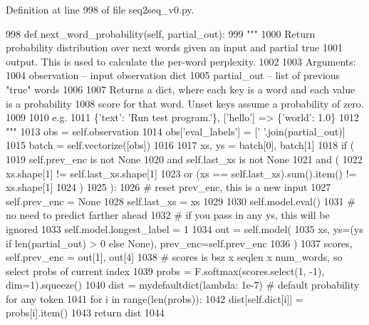 Definition at line 998 of file seq2seq\+\_\+v0.\+py.


\begin{DoxyCode}
998     \textcolor{keyword}{def }next\_word\_probability(self, partial\_out):
999         \textcolor{stringliteral}{"""}
1000 \textcolor{stringliteral}{        Return probability distribution over next words given an input and partial true}
1001 \textcolor{stringliteral}{        output. This is used to calculate the per-word perplexity.}
1002 \textcolor{stringliteral}{}
1003 \textcolor{stringliteral}{        Arguments:}
1004 \textcolor{stringliteral}{        observation -- input observation dict}
1005 \textcolor{stringliteral}{        partial\_out -- list of previous "true" words}
1006 \textcolor{stringliteral}{}
1007 \textcolor{stringliteral}{        Returns a dict, where each key is a word and each value is a probability}
1008 \textcolor{stringliteral}{        score for that word. Unset keys assume a probability of zero.}
1009 \textcolor{stringliteral}{}
1010 \textcolor{stringliteral}{        e.g.}
1011 \textcolor{stringliteral}{        \{'text': 'Run test program.'\}, ['hello'] => \{'world': 1.0\}}
1012 \textcolor{stringliteral}{        """}
1013         obs = self.observation
1014         obs[\textcolor{stringliteral}{'eval\_labels'}] = [\textcolor{stringliteral}{' '}.join(partial\_out)]
1015         batch = self.vectorize([obs])
1016 
1017         xs, ys = batch[0], batch[1]
1018         \textcolor{keywordflow}{if} (
1019             self.prev\_enc \textcolor{keywordflow}{is} \textcolor{keywordflow}{not} \textcolor{keywordtype}{None}
1020             \textcolor{keywordflow}{and} self.last\_xs \textcolor{keywordflow}{is} \textcolor{keywordflow}{not} \textcolor{keywordtype}{None}
1021             \textcolor{keywordflow}{and} (
1022                 xs.shape[1] != self.last\_xs.shape[1]
1023                 \textcolor{keywordflow}{or} (xs == self.last\_xs).sum().item() != xs.shape[1]
1024             )
1025         ):
1026             \textcolor{comment}{# reset prev\_enc, this is a new input}
1027             self.prev\_enc = \textcolor{keywordtype}{None}
1028         self.last\_xs = xs
1029 
1030         self.model.eval()
1031         \textcolor{comment}{# no need to predict farther ahead}
1032         \textcolor{comment}{# if you pass in any ys, this will be ignored}
1033         self.model.longest\_label = 1
1034         out = self.model(
1035             xs, ys=(ys \textcolor{keywordflow}{if} len(partial\_out) > 0 \textcolor{keywordflow}{else} \textcolor{keywordtype}{None}), prev\_enc=self.prev\_enc
1036         )
1037         scores, self.prev\_enc = out[1], out[4]
1038         \textcolor{comment}{# scores is bsz x seqlen x num\_words, so select probs of current index}
1039         probs = F.softmax(scores.select(1, -1), dim=1).squeeze()
1040         dist = mydefaultdict(\textcolor{keyword}{lambda}: 1e-7)  \textcolor{comment}{# default probability for any token}
1041         \textcolor{keywordflow}{for} i \textcolor{keywordflow}{in} range(len(probs)):
1042             dist[self.dict[i]] = probs[i].item()
1043         \textcolor{keywordflow}{return} dist
1044 \end{DoxyCode}


